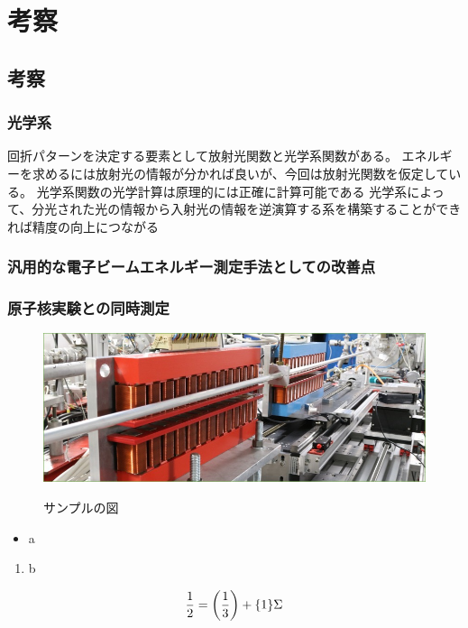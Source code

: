 \documentclass[a4paper,11pt,uplatex]{jsbook}
\begin{document}
\chapter{考察}
\section{考察}
\subsection{光学系}
回折パターンを決定する要素として放射光関数と光学系関数がある。
エネルギーを求めるには放射光の情報が分かれば良いが、今回は放射光関数を仮定している。
光学系関数の光学計算は原理的には正確に計算可能である
光学系によって、分光された光の情報から入射光の情報を逆演算する系を構築することができれば精度の向上につながる

\subsection{汎用的な電子ビームエネルギー測定手法としての改善点}

\subsection{原子核実験との同時測定}





\clearpage

\begin{figure}[tb]
  \centering
  \includegraphics[width=0.8\linewidth]{image/1-1.jpg}\\
  \caption{サンプルの図}
  \label{sample_image}
\end{figure}

\begin{itemize}
  \item a
\end{itemize}
\begin{enumerate}
  \item b
\end{enumerate}

\begin{align}
\frac{1}{2} = \qty(\frac{1}{3}) + \qty{1}\Sigma
\end{align}
\end{document}
